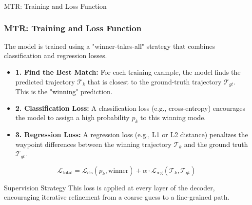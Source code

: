 \documentclass[10pt,aspectratio=169]{beamer}
\begin{document}
\begin{frame}{MTR: Training and Loss Function}
    \frametitle{MTR: Training and Loss Function}
    The model is trained using a "winner-takes-all" strategy that combines classification and regression losses.
    \begin{itemize}
        \item \textbf{1. Find the Best Match:} For each training example, the model finds the predicted trajectory $\mathcal{T}_k$ that is closest to the ground-truth trajectory $\mathcal{T}_{gt}$. This is the "winning" prediction.
        \item \textbf{2. Classification Loss:} A classification loss (e.g., cross-entropy) encourages the model to assign a high probability $p_k$ to this winning mode.
        \item \textbf{3. Regression Loss:} A regression loss (e.g., L1 or L2 distance) penalizes the waypoint differences between the winning trajectory $\mathcal{T}_k$ and the ground truth $\mathcal{T}_{gt}$.
    \end{itemize}
    \begin{equation}
        \mathcal{L}_{\text{total}} = \mathcal{L}_{\text{cls}}(p_k, \text{winner}) + \alpha \cdot \mathcal{L}_{\text{reg}}(\mathcal{T}_k, \mathcal{T}_{gt})
    \end{equation}
    \begin{alertblock}{Supervision Strategy}
        This loss is applied at every layer of the decoder, encouraging iterative refinement from a coarse guess to a fine-grained path.
    \end{alertblock}
\end{frame}
\end{document}
